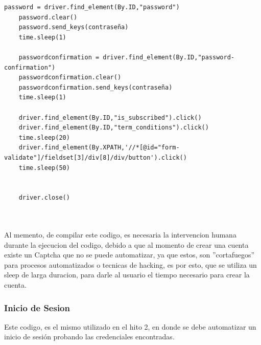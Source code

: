 \documentclass[]{article}
\begin{document}
\begin{lstlisting}[lenguaje=py]
    password = driver.find_element(By.ID,"password")
    password.clear()
    password.send_keys(contraseña)
    time.sleep(1)

    passwordconfirmation = driver.find_element(By.ID,"password-confirmation")
    passwordconfirmation.clear()
    passwordconfirmation.send_keys(contraseña)
    time.sleep(1)

    driver.find_element(By.ID,"is_subscribed").click()
    driver.find_element(By.ID,"term_conditions").click()
    time.sleep(20)
    driver.find_element(By.XPATH,'//*[@id="form-validate"]/fieldset[3]/div[8]/div/button').click()
    time.sleep(50)


    driver.close()
    \end{lstlisting}

    \\\\

    Al memento, de compilar este codigo, es necesaria la intervencion humana durante la ejecucion del codigo, debido a que al momento de crear
    una cuenta existe un Captcha que no se puede automatizar, ya que estos, son ''cortafuegos'' para procesos automatizados o tecnicas de
    hacking, es por esto, que se utiliza un sleep de larga duracion, para darle al usuario el tiempo necesario para crear la cuenta.

\newpage
\subsubsection{Inicio de Sesion}
    Este codigo, es el mismo utilizado en el hito 2, en donde se debe automatizar un inicio de sesión probando las credenciales encontradas.

    \\\\
\end{document}
